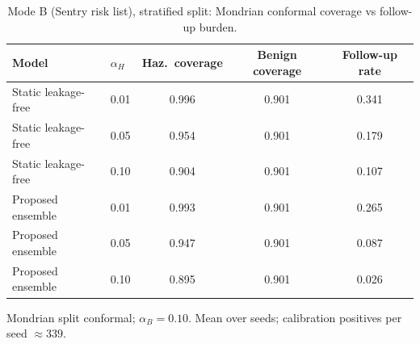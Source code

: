 \begin{table}[t]
\centering
\small
\caption{Mode B (Sentry risk list), stratified split: Mondrian conformal coverage vs follow-up burden.}
\label{tab:conf_sentry_stratified}
\begin{tabular}{llccc}
\toprule
Model & $\alpha_H$ & Haz.\ coverage & Benign coverage & Follow-up rate \\
\midrule
Static leakage-free & 0.01 & 0.996 & 0.901 & 0.341 \\
Static leakage-free & 0.05 & 0.954 & 0.901 & 0.179 \\
Static leakage-free & 0.10 & 0.904 & 0.901 & 0.107 \\
\midrule
Proposed ensemble & 0.01 & 0.993 & 0.901 & 0.265 \\
Proposed ensemble & 0.05 & 0.947 & 0.901 & 0.087 \\
Proposed ensemble & 0.10 & 0.895 & 0.901 & 0.026 \\
\bottomrule
\end{tabular}
\par\vspace{2pt}\footnotesize Mondrian split conformal; $\alpha_B=0.10$. Mean over seeds; calibration positives per seed $\approx 339$.
\end{table}
